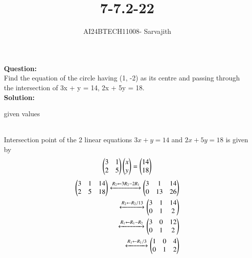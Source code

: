 \documentclass[journal]{IEEEtran}
\begin{document}

\vspace{3cm}

\title{7-7.2-22}
\author{AI24BTECH11008- Sarvajith
}
{\let\newpage\relax\maketitle}

\renewcommand{\thefigure}{\theenumi}
\renewcommand{\thetable}{\theenumi}
\setlength{\intextsep}{10pt} %
\renewcommand{\thetable}{\theenumi}
\textbf{Question: }\\
Find the equation of the circle having (1, -2) as its centre and passing through the
intersection of 3x + y = 14, 2x + 5y = 18.\\
\textbf{Solution: }\\
\renewcommand{\tablename}{TABLE 1}
\begin{table}[h!]    
\centering
 
\caption{given values}
 \label{tab1-7-7.2-22-1}
\end{table}\\
Intersection point of the 2 linear equations $3x + y = 14$ and $2x + 5y = 18$ is given by\\
\begin{align*}
\begin{pmatrix}3 & 1\\2 & 5\end{pmatrix}\begin{pmatrix}x \\ y\end{pmatrix} = \begin{pmatrix}14\\18\end{pmatrix}\\
\end{align*}
\begin{align*}
\begin{pmatrix}3 & 1 & 14\\2 & 5 & 18\end{pmatrix}\xleftrightarrow[]{R_2 \leftarrow {3R_2-2R_1}}\begin{pmatrix}3 & 1 & 14\\0 & 13 & 26\end{pmatrix}\\
\xleftrightarrow[]{R_2 \leftarrow {R_2/13}}\begin{pmatrix}3 & 1 & 14\\0 & 1 & 2\end{pmatrix}\\
\xleftrightarrow[]{R_1 \leftarrow {R_1-R_2}}\begin{pmatrix}3 & 0 & 12 \\0 & 1 & 2\end{pmatrix}\\
\xleftrightarrow[]{R_1 \leftarrow {R_1/3}}\begin{pmatrix}1& 0 & 4\\0 & 1 & 2\end{pmatrix}\\
\end{align*}
\end{document}
